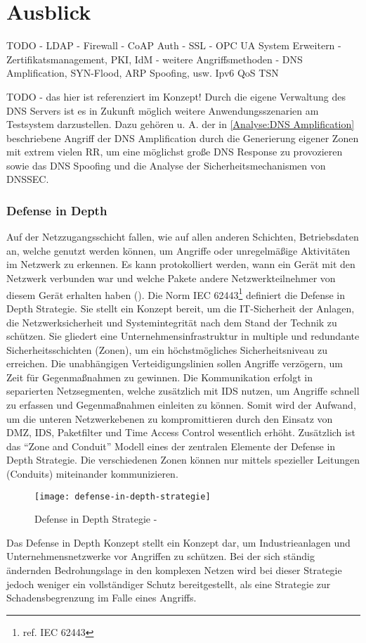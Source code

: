 \chapter{Ausblick}
\label{Ausblick}
TODO -
LDAP -
Firewall -
CoAP Auth -
SSL -
OPC UA System Erweitern - Zertifikatsmanagement, PKI, IdM - 
weitere Angriffsmethoden - DNS Amplification, SYN-Flood, ARP Spoofing, usw.
Ipv6
QoS
TSN

TODO - das hier ist referenziert im Konzept!
Durch die eigene Verwaltung des \ac{DNS} Servers ist es in Zukunft möglich weitere Anwendungsszenarien am Testsystem darzustellen. Dazu gehören u. A. der in \autoref{Analyse:DNS Amplification} beschriebene Angriff der \ac{DNS} Amplification durch die Generierung eigener Zonen mit extrem vielen \ac{RR}, um eine möglichst große \ac{DNS} Response zu provozieren sowie das \ac{DNS} Spoofing und die Analyse der Sicherheitsmechanismen von \ac{DNSSEC}.

\subsection{Defense in Depth}
Auf der Netzzugangsschicht fallen, wie auf allen anderen Schichten, Betriebsdaten an, welche genutzt werden können, um Angriffe oder unregelmäßige Aktivitäten im Netzwerk zu erkennen. Es kann protokolliert werden, wann ein Gerät mit den Netzwerk verbunden war und welche Pakete andere Netzwerkteilnehmer von diesem Gerät erhalten haben (\cite{sichKom2017}). Die Norm IEC 62443\footnote{ref. IEC 62443} definiert die Defense in Depth Strategie. Sie stellt ein Konzept bereit, um die IT-Sicherheit der Anlagen, die Netzwerksicherheit und Systemintegrität nach dem Stand der Technik zu schützen. Sie gliedert eine Unternehmensinfrastruktur in multiple und redundante Sicherheitsschichten (Zonen), um ein höchstmögliches Sicherheitsniveau zu erreichen. Die unabhängigen Verteidigungslinien sollen Angriffe verzögern, um Zeit für Gegenmaßnahmen zu gewinnen. Die Kommunikation erfolgt in separierten Netzsegmenten, welche zusätzlich mit \ac{IDS} nutzen, um Angriffe schnell zu erfassen und Gegenmaßnahmen einleiten zu können. Somit wird der Aufwand, um die unteren Netzwerkebenen zu kompromittieren durch den Einsatz von \ac{DMZ}, \ac{IDS}, Paketfilter und Time Access Control wesentlich erhöht. Zusätzlich ist das "`Zone and Conduit"' Modell eines der zentralen Elemente der Defense in Depth Strategie. Die verschiedenen Zonen können nur mittels spezieller Leitungen (Conduits) miteinander kommunizieren.  

\begin{figure}[h]
    \centering
    \texttt{[image: defense-in-depth-strategie]}
    \caption{Defense in Depth Strategie - \cite{kuipers2006}}
    \label{Kap3:Defense-in-Depth}
\end{figure}

\clearpage

Das Defense in Depth Konzept stellt ein Konzept dar, um Industrieanlagen und Unternehmensnetzwerke vor Angriffen zu schützen. Bei der sich ständig ändernden Bedrohungslage in den komplexen Netzen wird bei dieser Strategie jedoch weniger ein vollständiger Schutz bereitgestellt, als eine Strategie zur Schadensbegrenzung im Falle eines Angriffs.